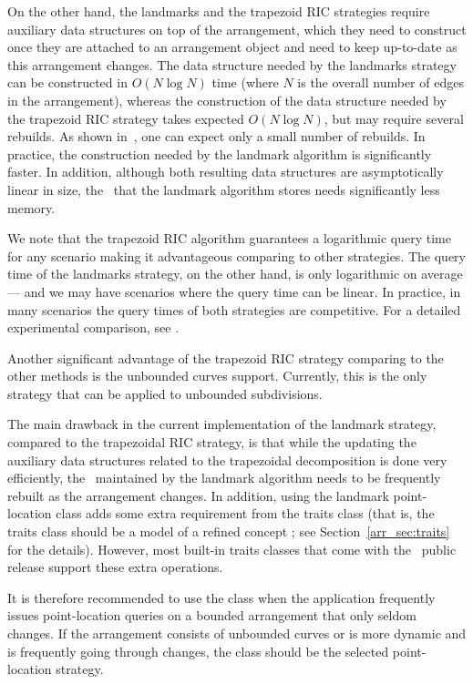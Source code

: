 On the other hand, the landmarks and the trapezoid RIC strategies
require auxiliary data structures on top of the arrangement, which
they need to construct once they are attached to an arrangement
object and need to keep up-to-date as this arrangement changes.
The data structure needed by the landmarks strategy can be constructed
in $O(N \log N)$ time (where $N$ is the overall number of edges in
the arrangement), whereas the construction of the data structure needed 
by the trapezoid RIC strategy takes expected $O(N \log N)$, but 
may require several rebuilds. As shown in~\cite{hkh-iiplgtds-12}, one can 
expect only a small number of rebuilds.
In practice, the construction needed by the landmark algorithm is
significantly faster. 
In addition, although both
resulting data structures are asymptotically linear in size, the
\kdtree\ that the landmark algorithm stores needs significantly
less memory. 

We note that the trapezoid RIC algorithm guarantees a
logarithmic query time for any scenario
making it advantageous comparing to other strategies.
The query time of the landmarks strategy, on the other hand,
 is only logarithmic on average --- and we may have
scenarios where the query time can be linear. 
In practice, in many scenarios
the query times of both strategies are competitive. For a detailed
experimental comparison, see \cite{cgal:hh-eplca-05}.

Another significant advantage of the trapezoid RIC strategy 
comparing to the other methods
is the unbounded curves support. 
Currently, this is the only strategy that can be 
applied to unbounded subdivisions.  

The main drawback in the current implementation of the landmark
strategy, compared to the trapezoidal RIC strategy, is that while
the updating the auxiliary data structures
related to the trapezoidal decomposition is done very efficiently,
the \kdtree\ maintained by the landmark algorithm needs to be
frequently rebuilt as the arrangement changes. In addition, using
the landmark point-location class adds some extra requirement
from the traits class (that is, the traits class should be a model
of a refined concept ; see
Section~\ref{arr_sec:traits} for the details). However, most
built-in traits classes that come with the \cgal\ public release
support these extra operations.

It is therefore recommended to use the
 class when the application
frequently issues point-location queries on a bounded
arrangement that only seldom changes. If the arrangement 
consists of unbounded curves or is more
dynamic and is frequently going through changes, the
 class should be the
selected point-location strategy.


